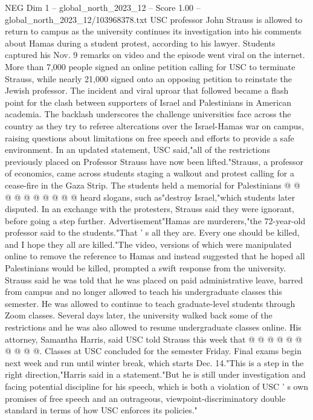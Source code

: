 \begin{textsample}{NEG Dim 1 – global\_north\_2023\_12 – Score 1.00 – global\_north\_2023\_12/103968378.txt}  \label{ex:f1_neg_367}
USC professor John Strauss is allowed to return to campus as the university continues its investigation into his comments about Hamas during a student protest, according to his lawyer.
Students captured his Nov. 9 remarks on video and the episode went viral on the internet.
More than 7,000 people signed an online petition calling for USC to terminate Strauss, while nearly 21,000 signed onto an opposing petition to reinstate the Jewish professor.
The incident and viral uproar that followed became a flash point for the clash between supporters of Israel and Palestinians in American academia.
The backlash underscores the challenge universities face across the country as they try to referee altercations over the Israel-Hamas war on campus, raising questions about limitations on free speech and efforts to provide a safe environment.
In an updated statement, USC said,"all of the restrictions previously placed on Professor Strauss have now been lifted."Strauss, a professor of economics, came across students staging a walkout and protest calling for a cease-fire in the Gaza Strip.
The students held a memorial for Palestinians @ @ @ @ @ @ @ @ @ @ heard slogans, such as"destroy Israel,"which students later disputed.
In an exchange with the protesters, Strauss said they were ignorant, before going a step further.
Advertisement"Hamas are murderers,"the 72-year-old professor said to the students."That ' s all they are.
Every one should be killed, and I hope they all are killed."The video, versions of which were manipulated online to remove the reference to Hamas and instead suggested that he hoped all Palestinians would be killed, prompted a swift response from the university.
Strauss said he was told that he was placed on paid administrative leave, barred from campus and no longer allowed to teach his undergraduate classes this semester.
He was allowed to continue to teach graduate-level students through Zoom classes.
Several days later, the university walked back some of the restrictions and he was also allowed to resume undergraduate classes online.
His attorney, Samantha Harris, said USC told Strauss this week that @ @ @ @ @ @ @ @ @ @.
Classes at USC concluded for the semester Friday.
Final exams begin next week and run until winter break, which starts Dec. 14."This is a step in the right direction,"Harris said in a statement."But he is still under investigation and facing potential discipline for his speech, which is both a violation of USC ' s own promises of free speech and an outrageous, viewpoint-discriminatory double standard in terms of how USC enforces its policies."

\end{textsample}
